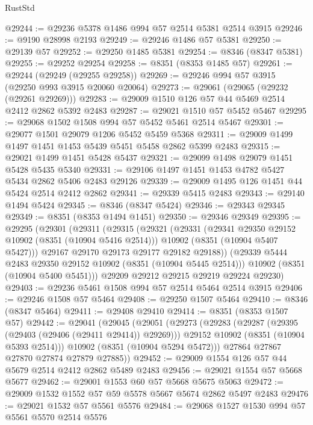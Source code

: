 \begin{lexlean}{RustStd}
\begin{coremodule}
@29244 := @29236 @5378 @1486 @994 @57 @2514 @5381 @2514 @3915
@29246 := @9190 @28998 @2193
@29249 := @29246 @1486 @57 @5381
@29250 := @29139 @57
@29252 := @29250 @1485 @5381
@29254 := @8346 (@8347 @5381)
@29255 := @29252 @29254
@29258 := @8351 (@8353 @1485 @57)
@29261 := @29244 (@29249 (@29255 @29258))
@29269 := @29246 @994 @57 @3915 (@29250 @993 @3915 @20060 @20064)
@29273 := @29061 (@29065 (@29232 (@29261 @29269)))
@29283 := @29009 @1510 @126 @57 @44 @5469 @2514 @2412 @2862 @5392 @2483
@29287 := @29021 @1510 @57 @5452 @5467
@29295 := @29068 @1502 @1508 @994 @57 @5452 @5461 @2514 @5467
@29301 := @29077 @1501 @29079 @1206 @5452 @5459 @5368
@29311 := @29009 @1499 @1497 @1451 @1453 @5439 @5451 @5458 @2862 @5399 @2483
@29315 := @29021 @1499 @1451 @5428 @5437
@29321 := @29099 @1498 @29079 @1451 @5428 @5435 @5340
@29331 := @29106 @1497 @1451 @1453 @4782 @5427 @5434 @2862 @5406 @2483 @29126
@29339 := @29009 @1495 @126 @1451 @44 @5424 @2514 @2412 @2862
@29341 := @29339 @5415 @2483
@29343 := @29140 @1494 @5424
@29345 := @8346 (@8347 @5424)
@29346 := @29343 @29345
@29349 := @8351 (@8353 @1494 @1451)
@29350 := @29346 @29349
@29395 := @29295
    (@29301
      (@29311
        (@29315
          (@29321
            (@29331
              (@29341 @29350 @29152 @10902 (@8351 (@10904 @5416 @2514)))
              @10902
              (@8351 (@10904 @5407 @5427)))
            @29167
            @29170
            @29173
            @29177
            @29182
            @29188))
        (@29339 @5444 @2483 @29350 @29152 @10902 (@8351 (@10904 @5445 @2514)))
        @10902
        (@8351 (@10904 @5400 @5451)))
      @29209
      @29212
      @29215
      @29219
      @29224
      @29230)
@29403 := @29236 @5461 @1508 @994 @57 @2514 @5464 @2514 @3915
@29406 := @29246 @1508 @57 @5464
@29408 := @29250 @1507 @5464
@29410 := @8346 (@8347 @5464)
@29411 := @29408 @29410
@29414 := @8351 (@8353 @1507 @57)
@29442 := @29041
    (@29045
      (@29051
        (@29273
          (@29283
            (@29287 (@29395 (@29403 (@29406 (@29411 @29414)) @29269)))
            @29152
            @10902
            (@8351 (@10904 @5393 @2514)))
          @10902
          (@8351 (@10904 @5294 @5472)))
        @27864
        @27867
        @27870
        @27874
        @27879
        @27885))
@29452 := @29009 @1554 @126 @57 @44 @5679 @2514 @2412 @2862 @5489 @2483
@29456 := @29021 @1554 @57 @5668 @5677
@29462 := @29001 @1553 @60 @57 @5668 @5675 @5063
@29472 := @29009 @1532 @1552 @57 @59 @5578 @5667 @5674 @2862 @5497 @2483
@29476 := @29021 @1532 @57 @5561 @5576
@29484 := @29068 @1527 @1530 @994 @57 @5561 @5570 @2514 @5576

\end{coremodule}
\end{lexlean}
